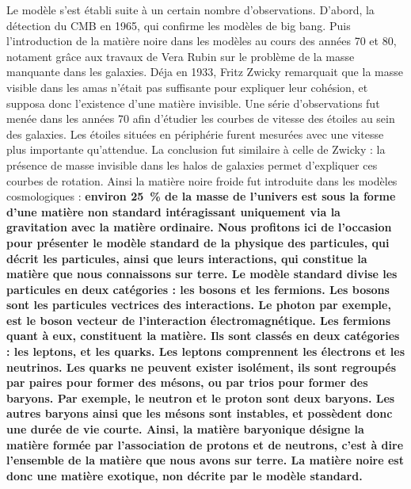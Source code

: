 \documentclass[11pt, twoside, a4paper, openright]{report}
\begin{document}
Le modèle s'est établi suite à un certain nombre d'observations. D'abord, la détection du CMB en 1965, qui confirme les modèles de big bang.
Puis l'introduction de la matière noire dans les modèles au cours des années 70 et 80, notament grâce aux travaux de Vera Rubin sur le problème de la masse manquante dans les galaxies. Déja en 1933, Fritz Zwicky remarquait que la masse visible dans les amas n'était pas suffisante pour expliquer leur cohésion, et supposa donc l'existence d'une matière invisible. Une série d'observations fut menée dans les années 70 afin d'étudier les courbes de vitesse des étoiles au sein des galaxies. Les étoiles situées en périphérie furent mesurées avec une vitesse plus importante qu'attendue. La conclusion fut similaire à celle de Zwicky : la présence de masse invisible dans les halos de galaxies permet d'expliquer ces courbes de rotation. Ainsi la matière noire froide fut introduite dans les modèles cosmologiques :
\textbf{
environ \SI{25}{\percent} de la masse de l'univers est sous la forme d'une matière non standard intéragissant uniquement via la gravitation avec la matière ordinaire. Nous profitons ici de l'occasion pour présenter le modèle standard de la physique des particules, qui décrit les particules, ainsi que leurs interactions, qui constitue la matière que nous connaissons sur terre. Le modèle standard divise les particules en deux catégories : les bosons et les fermions. Les bosons sont les particules vectrices des interactions. Le photon par exemple, est le boson vecteur de l'interaction électromagnétique. Les fermions quant à eux, constituent la matière. Ils sont classés en deux catégories : les leptons, et les quarks. Les leptons comprennent les électrons et les neutrinos. Les quarks ne peuvent exister isolément, ils sont regroupés par paires pour former des mésons, ou par trios pour former des baryons. Par exemple, le neutron et le proton sont deux baryons. Les autres baryons ainsi que les mésons sont instables, et possèdent donc une durée de vie courte. Ainsi, la matière baryonique désigne la matière formée par l'association de protons et de neutrons, c'est à dire l'ensemble de la matière que nous avons sur terre. La matière noire est donc une matière exotique, non décrite par le modèle standard.
}
\end{document}
